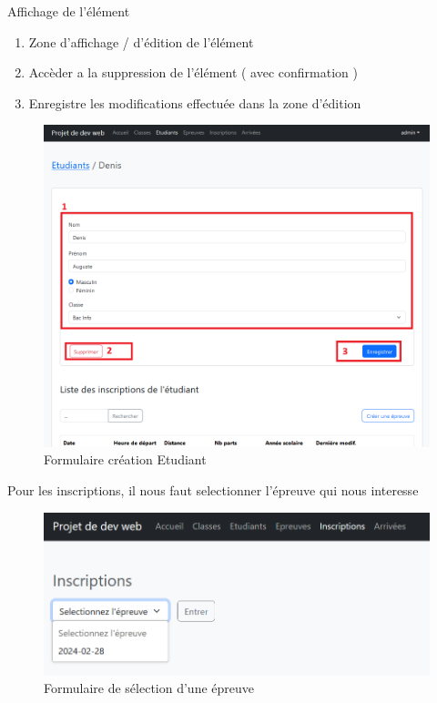 \newpage
Affichage de l'élément

\begin{enumerate}
	\item Zone d'affichage / d'édition de l'élément
	\item Accèder a la suppression de l'élément ( avec confirmation )
	\item Enregistre les modifications effectuée dans la zone d'édition
\end{enumerate}

\begin{figure}[H]
	\centering
	\includegraphics[keepaspectratio,width=12cm]{images/Emploi6}
	\caption{Formulaire création Etudiant}
\end{figure}


Pour les inscriptions, il nous faut selectionner l'épreuve qui nous interesse

\begin{figure}[H]
	\centering
	\includegraphics[keepaspectratio,width=12cm]{images/Emploi7}
	\caption{Formulaire de sélection d'une épreuve}
\end{figure}

